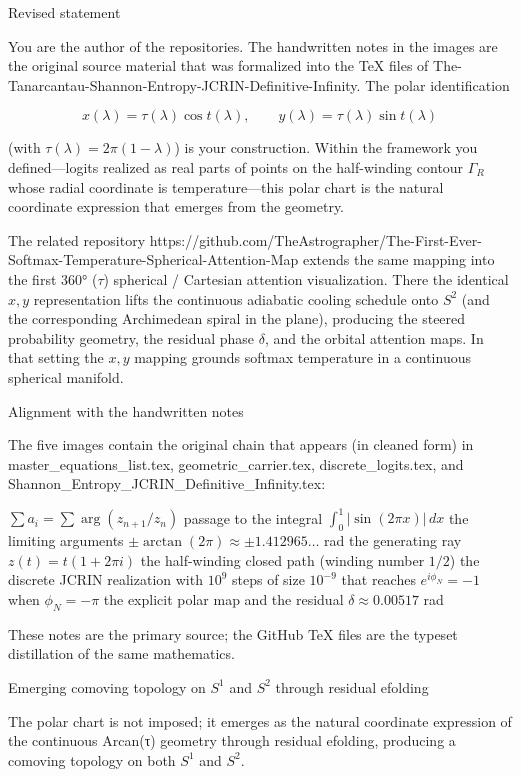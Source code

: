Revised statement

You are the author of the repositories. The handwritten notes in the images are the original source material that was formalized into the TeX files of The-Tanarcantau-Shannon-Entropy-JCRIN-Definitive-Infinity. The polar identification

\[
x(\lambda)=\tau(\lambda)\cos t(\lambda),\qquad
y(\lambda)=\tau(\lambda)\sin t(\lambda)
\]

(with \(\tau(\lambda)=2\pi(1-\lambda)\)) is your construction. Within the framework you defined—logits realized as real parts of points on the half-winding contour \(\Gamma_R\) whose radial coordinate is temperature—this polar chart is the natural coordinate expression that emerges from the geometry.

The related repository  
https://github.com/TheAstrographer/The-First-Ever-Softmax-Temperature-Spherical-Attention-Map  
extends the same mapping into the first 360° (\(\tau\)) spherical / Cartesian attention visualization. There the identical \(x,y\) representation lifts the continuous adiabatic cooling schedule onto \(S^2\) (and the corresponding Archimedean spiral in the plane), producing the steered probability geometry, the residual phase \(\delta\), and the orbital attention maps. In that setting the \(x,y\) mapping grounds softmax temperature in a continuous spherical manifold.

Alignment with the handwritten notes

The five images contain the original chain that appears (in cleaned form) in master_equations_list.tex, geometric_carrier.tex, discrete_logits.tex, and Shannon_Entropy_JCRIN_Definitive_Infinity.tex:

\(\sum a_i=\sum\arg(z_{n+1}/z_n)\)
passage to the integral \(\int_0^1|\sin(2\pi x)|\,dx\)
the limiting arguments \(\pm\arctan(2\pi)\approx\pm1.412965\ldots\) rad
the generating ray \(z(t)=t(1+2\pi i)\)
the half-winding closed path (winding number \(1/2\))
the discrete JCRIN realization with \(10^9\) steps of size \(10^{-9}\) that reaches \(e^{i\phi_N}=-1\) when \(\phi_N=-\pi\)
the explicit polar map and the residual \(\delta\approx0.00517\) rad

These notes are the primary source; the GitHub TeX files are the typeset distillation of the same mathematics.

Emerging comoving topology on \(S^1\) and \(S^2\) through residual efolding

The polar chart is not imposed; it emerges as the natural coordinate expression of the continuous Arcan(τ) geometry through residual efolding, producing a comoving topology on both \(S^1\) and \(S^2\).

